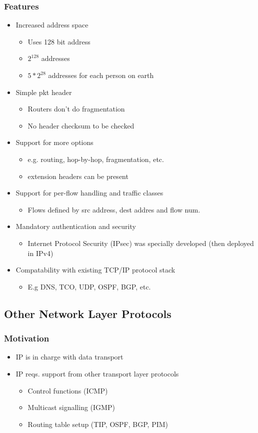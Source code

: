 \subsubsection{Features}
\begin{itemize}
	\item Increased address space
	\begin{itemize}
		\item Uses 128 bit address
		\item $2^{128}$ addresses
		\item $5*2^{28}$ addresses for each person on earth
	\end{itemize}
	\item Simple pkt header
	\begin{itemize}
		\item Routers don't do fragmentation
		\item No header checksum to be checked
	\end{itemize}
	\item Support for more options
	\begin{itemize}
		\item e.g. routing, hop-by-hop, fragmentation, etc.
		\item extension headers can be present
	\end{itemize}
	\item Support for per-flow handling and traffic classes
	\begin{itemize}
		\item Flows defined by src address, dest addres and flow num.
	\end{itemize}
	\item Mandatory authentication and security
	\begin{itemize}
		\item Internet Protocol Security (IPsec) was specially developed
			(then deployed in IPv4)
	\end{itemize}
	\item Compatability with existing TCP/IP protocol stack
	\begin{itemize}
		\item E.g DNS, TCO, UDP, OSPF, BGP, etc.
	\end{itemize}
\end{itemize}
\subsection{Other Network Layer Protocols}
\subsubsection{Motivation}
\begin{itemize}
	\item IP is in charge with data transport
	\item IP reqs. support from other transport layer protocols
	\begin{itemize}
		\item Control functions (ICMP)
		\item Multicast signalling (IGMP)
		\item Routing table setup (TIP, OSPF, BGP, PIM)
	\end{itemize}
\end{itemize}

